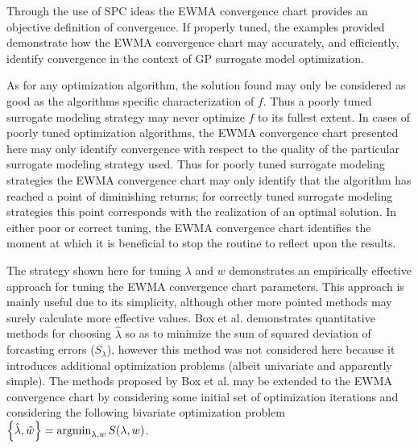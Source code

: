 \documentclass[12pt]{article}
\newcommand{\argmin}{\operatornamewithlimits{argmin}}
\begin{document}
%
%
Through the use of SPC ideas the EWMA convergence chart provides an objective definition of convergence. %
If properly tuned, the examples provided demonstrate how the  EWMA convergence chart may accurately, and efficiently, identify convergence in the context of GP surrogate model optimization.

%
%

As for any optimization algorithm, the solution found may only be considered as good as the algorithms specific characterization of $f$.
%
Thus a poorly tuned surrogate modeling strategy may never optimize $f$ to its fullest extent.
%
In cases of poorly tuned optimization algorithms, the EWMA convergence chart presented here may only identify convergence with respect to the quality of the particular surrogate modeling strategy used.
Thus for poorly tuned surrogate modeling strategies the EWMA convergence chart may only identify that the algorithm has reached a point of diminishing returns; for correctly tuned surrogate modeling strategies this point corresponds with the realization of an optimal solution.
%
In either poor or correct tuning, the EWMA convergence chart identifies the moment at which it is beneficial to stop the routine to reflect upon the results.
%

%
%

The strategy shown here for tuning $\lambda$ and $w$ demonstrates an empirically effective approach for tuning the EWMA convergence chart parameters. 
%
This approach is mainly useful due to its simplicity, although other more pointed methods may surely calculate more effective values.
%
Box et al. \cite{boxBook} demonstrates quantitative methods for choosing $\hat\lambda$ so as to minimize the sum of squared deviation of forcasting errors ($S_\lambda$), however this method was not considered here because it introduces additional optimization problems (albeit univariate and apparently simple).
%
The methods proposed by Box et al. may be extended to the EWMA convergence chart by considering some initial set of optimization iterations and considering the following bivariate optimization problem \mbox{$\left\{\hat\lambda, \hat w \right\} = \argmin_{\lambda, w} S(\lambda, w)$.} 
\end{document}
